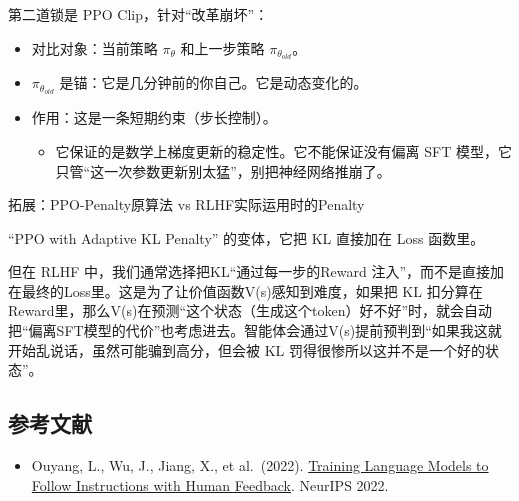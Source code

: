 第二道锁是 PPO Clip，针对``改革崩坏''：

\begin{itemize}
\tightlist
\item
  对比对象：当前策略 \(\pi_\theta\) 和上一步策略 \(\pi_{\theta_{old}}\)。
\item
  \(\pi_{\theta_{old}}\) 是锚：它是几分钟前的你自己。它是动态变化的。
\item
  作用：这是一条短期约束（步长控制）。

  \begin{itemize}
  \tightlist
  \item
    它保证的是数学上梯度更新的稳定性。它不能保证没有偏离 SFT 模型，它只管``这一次参数更新别太猛''，别把神经网络推崩了。
  \end{itemize}
\end{itemize}

拓展：PPO-Penalty原算法 vs RLHF实际运用时的Penalty

``PPO with Adaptive KL Penalty'' 的变体，它把 KL 直接加在 Loss 函数里。

但在 RLHF 中，我们通常选择把KL``通过每一步的Reward 注入''，而不是直接加在最终的Loss里。这是为了让价值函数V(s)感知到难度，如果把 KL 扣分算在Reward里，那么V(s)在预测``这个状态（生成这个token）好不好''时，就会自动把``偏离SFT模型的代价''也考虑进去。智能体会通过V(s)提前预判到``如果我这就开始乱说话，虽然可能骗到高分，但会被 KL 罚得很惨所以这并不是一个好的状态''。

\FloatBarrier
{}
\hypertarget{ux53c2ux8003ux6587ux732e-79}{%
\subsection{参考文献}\label{ux53c2ux8003ux6587ux732e-79}}

\vspace{0.25em}
\begin{itemize}
\tightlist
\item
  Ouyang, L., Wu, J., Jiang, X., et al.~(2022). \href{https://arxiv.org/abs/2203.02155}{Training Language Models to Follow Instructions with Human Feedback}. NeurIPS 2022.
\end{itemize}

\clearpage
